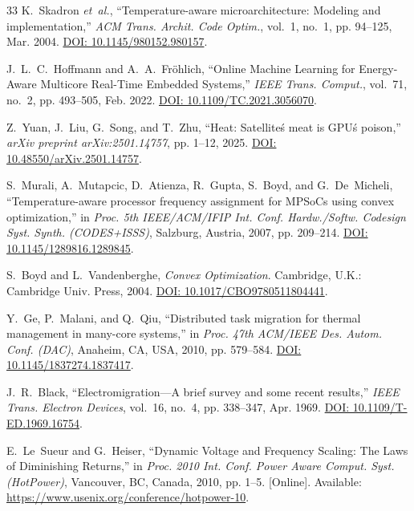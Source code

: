 \documentclass[journal]{IEEEtran}
\begin{document}
\begin{thebibliography}{33}
K.~Skadron \emph{et~al.}, ``Temperature-aware microarchitecture: Modeling and implementation,'' \emph{ACM Trans. Archit. Code Optim.}, vol.~1, no.~1, pp. 94--125, Mar. 2004. \href{https://doi.org/10.1145/980152.980157}{DOI: 10.1145/980152.980157}.

J.~L.~C.~Hoffmann and A.~A.~Fr{\"o}hlich, ``Online Machine Learning for Energy-Aware Multicore Real-Time Embedded Systems,'' \emph{IEEE Trans. Comput.}, vol.~71, no.~2, pp. 493--505, Feb. 2022. \href{https://doi.org/10.1109/TC.2021.3056070}{DOI: 10.1109/TC.2021.3056070}.

Z.~Yuan, J.~Liu, G.~Song, and T.~Zhu, ``Heat: Satellite\'s meat is GPU\'s poison,'' \emph{arXiv preprint arXiv:2501.14757}, pp. 1--12, 2025. \href{https://doi.org/10.48550/arXiv.2501.14757}{DOI: 10.48550/arXiv.2501.14757}.

S.~Murali, A.~Mutapcic, D.~Atienza, R.~Gupta, S.~Boyd, and G.~De~Micheli, ``Temperature-aware processor frequency assignment for MPSoCs using convex optimization,'' in \emph{Proc. 5th IEEE/ACM/IFIP Int. Conf. Hardw./Softw. Codesign Syst. Synth. (CODES+ISSS)}, Salzburg, Austria, 2007, pp. 209--214. \href{https://doi.org/10.1145/1289816.1289845}{DOI: 10.1145/1289816.1289845}.

S.~Boyd and L.~Vandenberghe, \emph{Convex Optimization}. Cambridge, U.K.: Cambridge Univ. Press, 2004. \href{https://doi.org/10.1017/CBO9780511804441}{DOI: 10.1017/CBO9780511804441}.

Y.~Ge, P.~Malani, and Q.~Qiu, ``Distributed task migration for thermal management in many-core systems,'' in \emph{Proc. 47th ACM/IEEE Des. Autom. Conf. (DAC)}, Anaheim, CA, USA, 2010, pp. 579--584. \href{https://doi.org/10.1145/1837274.1837417}{DOI: 10.1145/1837274.1837417}.

J.~R.~Black, ``Electromigration---A brief survey and some recent results,'' \emph{IEEE Trans. Electron Devices}, vol.~16, no.~4, pp. 338--347, Apr. 1969. \href{https://doi.org/10.1109/T-ED.1969.16754}{DOI: 10.1109/T-ED.1969.16754}.

E.~Le~Sueur and G.~Heiser, ``Dynamic Voltage and Frequency Scaling: The Laws of Diminishing Returns,'' in \emph{Proc. 2010 Int. Conf. Power Aware Comput. Syst. (HotPower)}, Vancouver, BC, Canada, 2010, pp. 1--5. [Online]. Available: \url{https://www.usenix.org/conference/hotpower-10}.


\end{thebibliography}
\end{document}
